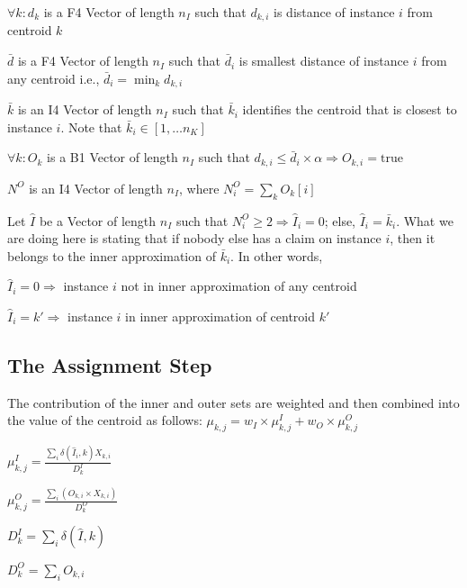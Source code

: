 \be
\item \(\forall k: d_k \) is a F4 Vector of length \(n_I\) such that \(d_{k, i}\)
is distance of instance \(i\) from centroid \(k\)
\item \(\bar{d}\) is a F4 Vector of length \(n_I\) such that \(\bar{d}_i\) is
smallest distance of instance \(i\) from any centroid i.e.,
\(\bar{d}_i = \min_k d_{k, i}\)
\item \(\bar{k}\) is an I4 Vector of length \(n_I\) such that \(\bar{k}_i\) identifies
the centroid that is closest to instance \(i\). Note that 
\(\bar{k}_i \in [1, \ldots n_K]\)
\item \(\forall k: O_k\) is a B1 Vector of length \(n_I\) such that 
\(d_{k, i} \leq \bar{d}_i \times \alpha \Rightarrow O_{k, i} = \mathrm{true}\)
\item \(N^O\) is an I4 Vector of length \(n_I\), 
where \(N^O_i  = \sum_k O_k[i]\)
\item Let \(\hat{I}\) be a Vector of length \(n_I\) such that 
\(N^O_i \geq 2 \Rightarrow \hat{I}_i = 0\); else, \(\hat{I}_i = \bar{k}_i\). What
we are doing here is stating that if nobody else has a claim on instance \(i\), then
it belongs to the inner approximation of \(\bar{k}_i\). In other words,
\be
\item \(\hat{I}_i = 0 \Rightarrow \) instance \(i\) not in inner approximation
of any centroid
\item \(\hat{I}_i = k' \Rightarrow \) instance \(i\) in inner approximation
of centroid \(k'\)
\ee
\ee

\subsection{The Assignment Step}
\label{assignment}

\be
\item The contribution of the inner and outer sets are weighted and then
combined into the value of the centroid as follows:
\(\mu_{k, j} = w_I \times \mu^I_{k, j} +  w_O \times \mu^O_{k, j} \)
\item 
\(\mu^I_{k, j} = \frac{\sum_i \delta(\hat{I}_i, k) X_{k, i}}{D^I_k}\)
\item 
\(\mu^O_{k, j} = \frac{\sum_i (O_{k, i} \times X_{k, i})}{D^O_k}\)
\item \(D^I_k = \sum_i \delta(\hat{I}, k)\)
\item \(D^O_k = \sum_i O_{k, i}\)
\ee


